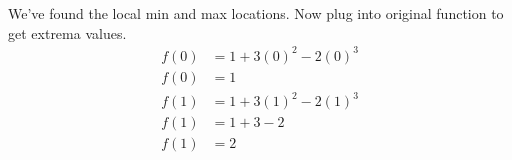\documentclass{article}
\begin{document}
\begin{description}
\begin{description}
                We've found the local min and max locations. Now plug into original function to get extrema values.
                \begin{align*}
                  f(0) & = 1 + 3(0)^2 - 2(0)^3 \\
                  f(0) & = 1                   \\[2em]
                  f(1) & = 1 + 3(1)^2 - 2(1)^3 \\
                  f(1) & = 1 + 3 - 2           \\
                  f(1) & = 2
                \end{align*}
        \end{description}
\end{description}
\end{document}
